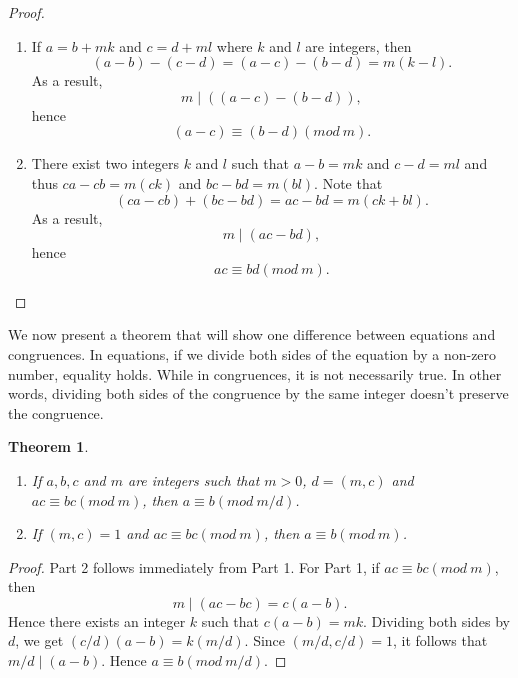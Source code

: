 \documentclass[12pt,letterpaper]{book}
\newtheorem{theorem}{Theorem}
\begin{document}
\begin{proof}
\begin{enumerate}
\item{If $a=b+mk$ and $c=d+ml$ where $k$ and $l$ are integers, then
\begin{equation*}
(a-b)-(c-d)=(a-c)-(b-d)=m(k-l).
\end{equation*}
As a result,
\begin{equation*}
m\mid ((a-c)-(b-d)),
\end{equation*}
hence
\begin{equation*}
(a-c)\equiv (b-d)(mod \ m). \end{equation*}}

\item{There exist two integers $k$ and $l$
such that $a-b=mk$ and $c-d=ml$ and thus $ca-cb=m(ck)$ and
$bc-bd=m(bl)$. Note that
\begin{equation*}
(ca-cb)+(bc-bd)=ac-bd=m(ck+bl).
\end{equation*}
As a result, \begin{equation*}m\mid (ac-bd), \end{equation*}hence
\begin{equation*}
ac\equiv bd(mod \ m). \end{equation*}}
\end{enumerate}
\end{proof}

We now present a theorem that will show one difference between
equations and congruences.  In equations, if we divide both sides of
the equation by a non-zero number, equality holds.  While in
congruences, it is not necessarily true.  In other words, dividing
both sides of the congruence by the same integer doesn't preserve
the congruence.

\begin{theorem}
~
\begin{enumerate}\label{congdiv}
\item {If $a,b, c$ and $m$ are integers such that $m>0$, $d=(m,c)$ and\\
$ac\equiv bc(mod \ m)$, then $a\equiv b (mod \ m/d)$.}
\item {If $(m,c)=1$ and $ac\equiv bc(mod \ m)$, then $a\equiv b(mod \ m)$.}
\end{enumerate}
\end{theorem}

\begin{proof}
Part 2 follows immediately from Part 1. For Part 1, if $ac\equiv
bc(mod \ m)$, then
\begin{equation*}
m\mid (ac-bc)=c(a-b).
\end{equation*}
Hence there exists an integer $k$ such that $c(a-b)=mk$. Dividing both sides by
$d$, we get $(c/d)(a-b)=k(m/d)$. Since $(m/d,c/d)=1$,  it follows
that $m/d \mid (a-b)$.  Hence $a\equiv b (mod \ m/d)$.
\end{proof}
\end{document}

